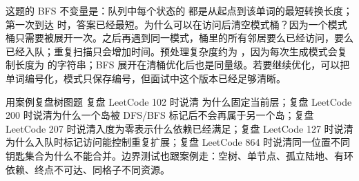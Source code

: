 这题的 BFS 不变量是：队列中每个状态的  都是从起点到该单词的最短转换长度；第一次到达  时，答案已经最短。为什么可以在访问后清空模式桶？因为一个模式桶只需要被展开一次。之后再遇到同一模式，桶里的所有邻居要么已经访问，要么已经入队；重复扫描只会增加时间。预处理复杂度约为 ，因为每次生成模式会复制长度为  的字符串；BFS 展开在清桶优化后也是同量级。若要继续优化，可以把单词编号化，模式只保存编号，但面试中这个版本已经足够清晰。

\begin{principlebox}{用案例复盘树图题}
复盘 LeetCode 102 时说清  为什么固定当前层；复盘 LeetCode 200 时说清为什么一个岛被 DFS/BFS 标记后不会再属于另一个岛；复盘 LeetCode 207 时说清入度为零表示什么依赖已经满足；复盘 LeetCode 127 时说清为什么入队时标记访问能控制重复扩展；复盘 LeetCode 864 时说清同一位置不同钥匙集合为什么不能合并。边界测试也跟案例走：空树、单节点、孤立陆地、有环依赖、终点不可达、同格子不同资源。
\end{principlebox}





